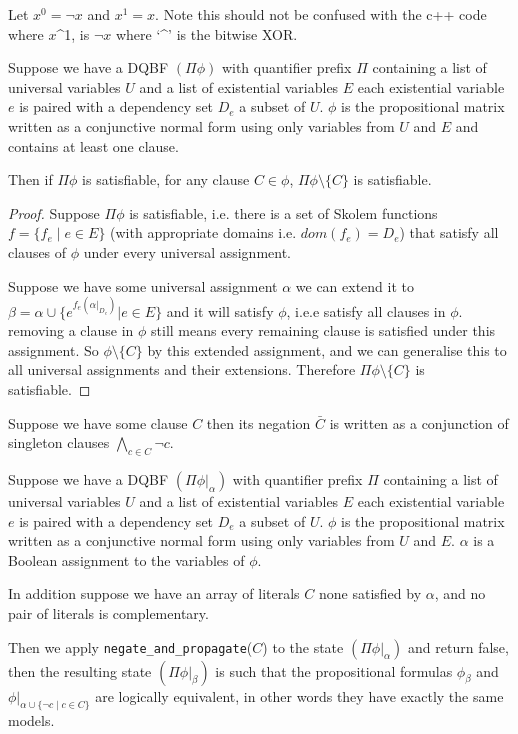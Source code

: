\documentclass[runningheads]{llncs}
\begin{document}
	Let $x^{0}=\lnot x$ and $x^1= x$. Note this should not be confused with the c++ code where $x$\textasciicircum1, is $\lnot x$ where `\textasciicircum' is the bitwise XOR.
	\begin{lemma}
		Suppose we have a DQBF $(\Pi \phi)$ with quantifier prefix $\Pi$ containing a list of universal variables $U$ and a list of existential variables $E$ each existential variable $e$ is paired with a dependency set $D_e$ a subset of $U$. $\phi$ is the propositional matrix written as a conjunctive normal form using only variables from $U$ and $E$ and contains at least one clause.
		
		Then if $\Pi \phi$ is satisfiable, for any clause $C\in \phi$, $\Pi \phi\setminus\{C\}$ is satisfiable.
		
	\end{lemma}
	\begin{proof}
				Suppose $\Pi \phi$ is satisfiable, i.e. there is a set of Skolem functions $f=\{f_e \mid e\in E \}$ (with appropriate domains i.e. $dom(f_e)=D_e$) that satisfy all clauses of $\phi$ under every universal assignment.
		
		Suppose we have some universal assignment $\alpha$ we can extend it to $\beta= \alpha\cup \{e^{f_e(\alpha|_{D_e})} | e\in E\}$ and it will satisfy $\phi$, i.e.e satisfy all clauses in $\phi$. removing a clause in $\phi$ still means every remaining clause is satisfied under this assignment. So $\phi\setminus\{C\}$ by this extended assignment, and we can generalise this to all universal assignments and their extensions. Therefore $\Pi \phi\setminus\{C\}$ is satisfiable.
	\end{proof}
	
	Suppose we have some clause $C$ then its negation $\bar C $ is written as a conjunction of singleton clauses $\bigwedge_{c\in C} \lnot c$. 
	\begin{lemma}
		Suppose we have a DQBF $(\Pi \phi|_\alpha)$ with quantifier prefix $\Pi$ containing a list of universal variables $U$ and a list of existential variables $E$ each existential variable $e$ is paired with a dependency set $D_e$ a subset of $U$. $\phi$ is the propositional matrix written as a conjunctive normal form using only variables from $U$ and $E$. $\alpha$ is a Boolean assignment to the variables of $\phi$.
		
		In addition suppose we have an array of literals $C$ none satisfied by $\alpha$, and no pair of literals is complementary.
		
		Then we apply \texttt{negate\_and\_propagate}($C$) to the state $(\Pi \phi|_\alpha)$ and return false, then the resulting state $(\Pi \phi|_\beta)$ is such that the propositional formulas $\phi_\beta$ and $\phi|_{\alpha\cup\{\neg c \mid c \in C\}}$ are logically equivalent, in other words they have exactly the same models.
		
	
		
		
	\end{lemma}
	
\end{document}
